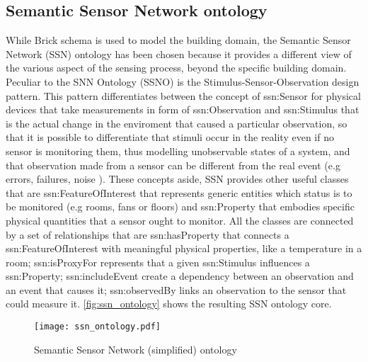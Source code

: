 \subsection{Semantic Sensor Network ontology} \label{subsec:ssn}
While Brick schema is used to model the building domain, the Semantic Sensor Network (SSN) ontology \cite{ssn_ontology} has been chosen because it provides a different view of the various aspect of the sensing process, beyond the specific building domain. Peculiar to the SNN Ontology (SSNO) is the Stimulus-Sensor-Observation design pattern.
This pattern differentiates between the concept of ssn:Sensor for physical devices that take measurements in form of ssn:Observation and ssn:Stimulus that is the actual change in the enviroment that caused a particular observation, so that it is possible to differentiate that stimuli occur in the reality even if no sensor is monitoring them, thus modelling unobservable states of a system, and that observation made from a sensor can be different from the real event (e.g errors, failures, noise ). These concepts aside, SSN provides other useful classes that are ssn:FeatureOfInterest that represents generic entities which status is to be monitored (e.g rooms, fans or floors) and ssn:Property that embodies specific physical quantities that a sensor ought to monitor. All the classes are connected by a set of relationships that are ssn:hasProperty that connects a ssn:FeatureOfInterest with meaningful physical properties, like a temperature in a room; ssn:isProxyFor represents that a given ssn:Stimulus influences a ssn:Property; ssn:includeEvent create a dependency between an observation and an event that causes it; ssn:observedBy links an observation to the sensor that could measure it. \autoref{fig:ssn_ontology} shows the resulting SSN ontology core.

\begin{figure}
  \centering
  \texttt{[image: ssn\_ontology.pdf]}
  \caption{Semantic Sensor Network (simplified) ontology}
  \label{fig:ssn_ontology}
\end{figure}


